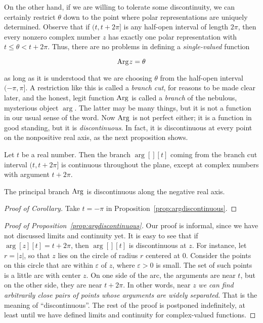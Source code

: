 \documentclass[twocolumn,12pt]{article}
\begin{document}
On the other hand, if we are willing to tolerate some discontinuity, we can certainly restrict $\theta$ down to the point where polar representations are uniquely determined. Observe that if $(t, t + 2 \pi]$ is any half-open interval of length $2 \pi$, then every nonzero complex number $z$ has exactly one polar representation with $t \leq \theta < t + 2 \pi$. Thus, there are no problems in defining a \emph{single-valued} function
\begin{gridenv}
  \[
    \Arg z = \theta
  \]
\end{gridenv}
as long as it is understood that we are choosing $\theta$ from the half-open interval $(-\pi, \pi]$. A restriction like this is called a \emph{branch cut}, for reasons to be made clear later, and the honest, legit function $\Arg$ is called a \emph{branch} of the nebulous, mysterious object $\arg$. The latter may be many things, but it is not a function in our usual sense of the word. Now $\Arg$ is not perfect either; it is a function in good standing, but it is \emph{discontinuous}. In fact, it is discontinuous at every point on the nonpositive real axis, as the next proposition shows.
\begin{proposition} \label{prop:argdiscontinuous}
  Let $t$ be a real number. Then the branch $\arg[][t]$ coming from the branch cut interval $(t, t+2\pi]$ is continuous throughout the plane, except at complex numbers with argument $t + 2\pi$. 
\end{proposition}
\begin{corollary}
  The principal branch $\Arg$ is discontinuous along the negative real axis.
\end{corollary}
\begin{proof}[Proof of Corollary]
  Take $t = -\pi$ in Proposition~\ref{prop:argdiscontinuous}.
\end{proof}
\begin{proof}[Proof of Proposition~\ref{prop:argdiscontinuous}]
  Our proof is informal, since we have not discussed limits and continuity yet. It is easy to see that if $\arg[z][t] = t + 2\pi$, then $\arg[][t]$ is discontinuous at $z$. For instance, let $r = |z|$, so that $z$ lies on the circle of radius $r$ centered at $0$. Consider the points on this circle that are within $\varepsilon$ of $z$, where $\varepsilon > 0$ is small. The set of such points is a little arc with center $z$. On one side of the arc, the arguments are near $t$, but on the other side, they are near $t + 2\pi$. In other words, near $z$ \emph{we can find arbitrarily close pairs of points whose arguments are widely separated}. That is the meaning of ``discontinuous''. The rest of the proof is postponed indefinitely, at least until we have defined limits and continuity for complex-valued functions.
\end{proof}
%
\end{document}
